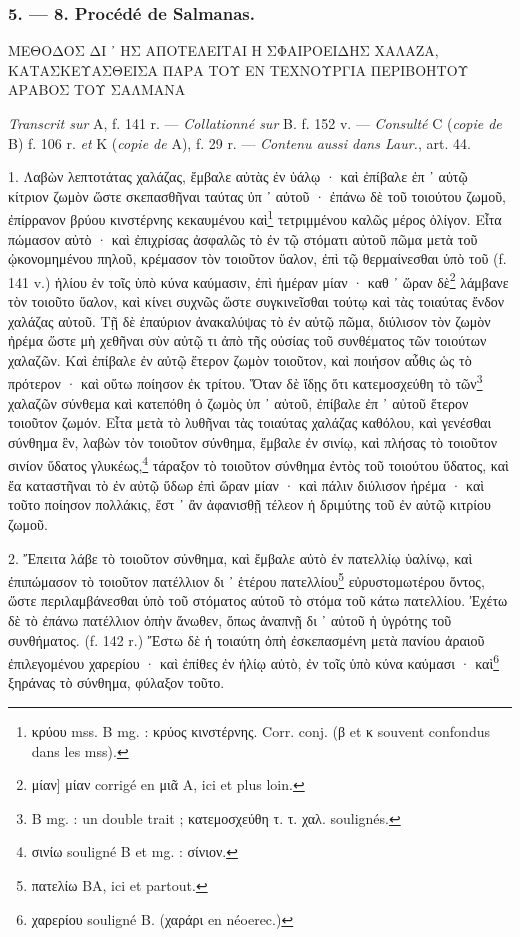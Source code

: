 \documentclass[a4paper, 11pt, oneside, polutonikogreek, french]{article}
\begin{document}
\bigskip
\centerline{\EightStarTaper}
\centerline{\EightStarTaper\EightStarTaper}
\bigskip

\subsubsection{5. --- 8. Procédé de Salmanas.}

ΜΕΘΟΔΟΣ ΔΙ ᾽ ΗΣ ΑΠΟΤΕΛΕΙΤΑΙ Η ΣΦΑΙΡΟΕΙΔΗΣ ΧΑΛΑΖΑ, ΚΑΤΑΣΚΕΥΑΣΘΕΙΣΑ ΠΑΡΑ ΤΟΥ ΕΝ ΤΕΧΝΟΥΡΓΙΑ ΠΕΡΙΒΟΗΤΟΥ ΑΡΑΒΟΣ ΤΟΥ ΣΑΛΜΑΝΑ

\emph{Transcrit sur} A, f. 141 r. --- \emph{Collationné sur} B. f. 152 v. --- \emph{Consulté} C (\emph{copie de} B) f. 106 r. \emph{et} K (\emph{copie de} A), f. 29 r. --- \emph{Contenu aussi dans Laur.}, art. 44.

1. Λαβὼν λεπτοτάτας χαλάζας, ἔμβαλε αὐτὰς ἐν ὑάλῳ · καὶ ἐπίβαλε ἐπ ᾽ αὐτῷ κίτριον ζωμὸν ὥστε σκεπασθῆναι ταύτας ὐπ ᾽ αὐτοῦ · ἐπάνω δὲ τοῦ τοιούτου ζωμοῦ, ἐπίρρανον βρύου κινστέρνης κεκαυμένου καὶ\footnote{κρύου mss. B mg. : κρύος κινστέρνης. Corr. conj. (β et κ souvent confondus dans les mss).} τετριμμένου καλῶς μέρος ὀλίγον. Εἶτα πώμασον αὐτὸ · καὶ ἐπιχρίσας ἀσφαλῶς τὸ ἐν τῷ στόματι αὐτοῦ πῶμα μετὰ τοῦ ᾠκονομημένου πηλοῦ, κρέμασον τὸν τοιοῦτον ὕαλον, ἐπὶ τῷ θερμαίνεσθαι ὑπὸ τοῦ (f. 141 v.) ἡλίου ἐν τοῖς ὑπὸ κύνα καύμασιν, ἐπὶ ἡμέραν μίαν · καθ ᾽ ὥραν δὲ\footnote{μίαν] μίαν corrigé en μιᾶ A, ici et plus loin.} λάμβανε τὸν τοιοῦτο ὕαλον, καὶ κίνει συχνῶς ὥστε συγκινεῖσθαι τούτῳ καὶ τὰς τοιαύτας ἔνδον χαλάζας αὐτοῦ. Τῇ δὲ ἐπαύριον ἀνακαλύψας τὸ ἐν αὐτῷ πῶμα, διύλισον τὸν ζωμὸν ἠρέμα ὥστε μὴ χεθῆναι σὺν αὐτῷ τι ἀπὸ τῆς οὐσίας τοῦ συνθέματος τῶν τοιούτων χαλαζῶν. Καὶ ἐπίβαλε ἐν αὐτῷ ἕτερον ζωμὸν τοιοῦτον, καὶ ποιήσον αὖθις ὡς τὸ πρότερον · καὶ οὕτω ποίησον ἐκ τρίτου. Ὅταν δὲ ἴδῃς ὅτι κατεμοσχεύθη τὸ τῶν\footnote{B mg. : un double trait ; κατεμοσχεύθη τ. τ. χαλ. soulignés.} χαλαζῶν σύνθεμα καὶ κατεπόθη ὁ ζωμὸς ὑπ ᾽ αὐτοῦ, ἐπίβαλε ἐπ ᾽ αὐτοῦ ἕτερον τοιοῦτον ζωμόν. Εἶτα μετὰ τὸ λυθῆναι τὰς τοιαύτας χαλάζας καθόλου, καὶ γενέσθαι σύνθημα ἓν, λαβὼν τὸν τοιοῦτον σύνθημα, ἔμβαλε ἐν σινίῳ, καὶ πλήσας τὸ τοιοῦτον σινίον ὕδατος γλυκέως,\footnote{σινίω souligné B et mg. : σίνιον.} τάραξον τὸ τοιοῦτον σύνθημα ἐντὸς τοῦ τοιούτου ὕδατος, καὶ ἔα καταστῆναι τὸ ἐν αὐτῷ ὕδωρ ἐπὶ ὥραν μίαν · καὶ πάλιν διύλισον ἠρέμα · καὶ τοῦτο ποίησον πολλάκις, ἔστ ᾽ ἂν ἀφανισθῇ τέλεον ἡ δριμύτης τοῦ ἐν αὐτῷ κιτρίου ζωμοῦ.

2. Ἔπειτα λάβε τὸ τοιοῦτον σύνθημα, καὶ ἔμβαλε αὐτὸ ἐν πατελλίῳ ὑαλίνῳ, καὶ ἐπιπώμασον τὸ τοιοῦτον πατέλλιον δι ᾽ ἑτέρου πατελλίου\footnote{πατελίω BA, ici et partout.} εὐρυστομωτέρου ὄντος, ὥστε περιλαμβάνεσθαι ὑπὸ τοῦ στόματος αὐτοῦ τὸ στόμα τοῦ κάτω πατελλίου. Ἐχέτω δὲ τὸ ἐπάνω πατέλλιον ὀπὴν ἄνωθεν, ὅπως ἀναπνῇ δι ᾽ αὐτοῦ ἡ ὑγρότης τοῦ συνθήματος. (f. 142 r.) Ἔστω δὲ ἡ τοιαύτη ὀπὴ ἐσκεπασμένη μετὰ πανίου ἀραιοῦ ἐπιλεγομένου χαρερίου · καὶ ἐπίθες ἐν ἡλίῳ αὐτὸ, ἐν τοῖς ὑπὸ κύνα καύμασι · καὶ\footnote{χαρερίου souligné B. (χαράρι en néoerec.)} ξηράνας τὸ σύνθημα, φύλαξον τοῦτο.
\end{document}
